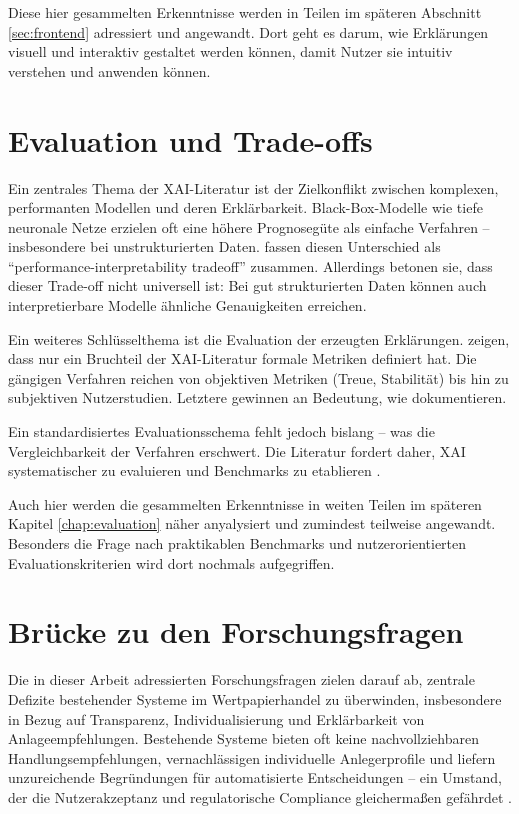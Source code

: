   Diese hier gesammelten Erkenntnisse werden in Teilen im späteren Abschnitt \ref{sec:frontend} adressiert und angewandt.
  Dort geht es darum, wie Erklärungen visuell und interaktiv gestaltet werden können, damit Nutzer sie intuitiv verstehen und anwenden können.

\section{Evaluation und Trade-offs}

  Ein zentrales Thema der \acs{XAI}-Literatur ist der Zielkonflikt zwischen komplexen, performanten Modellen und deren Erklärbarkeit.
  Black-Box-Modelle wie tiefe neuronale Netze erzielen oft eine höhere Prognosegüte als einfache Verfahren – insbesondere bei unstrukturierten Daten.
  \textcite[S. 3]{Liao2022} fassen diesen Unterschied als \enquote{performance-interpretability tradeoff} zusammen.
  Allerdings betonen sie, dass dieser Trade-off nicht universell ist:
  Bei gut strukturierten Daten können auch interpretierbare Modelle ähnliche Genauigkeiten erreichen.

  Ein weiteres Schlüsselthema ist die Evaluation der erzeugten Erklärungen.
  \textcite[S. 1]{Kadir2023} zeigen, dass nur ein Bruchteil der \acs{XAI}-Literatur formale Metriken definiert hat.
  Die gängigen Verfahren reichen von objektiven Metriken (Treue, Stabilität) bis hin zu subjektiven Nutzerstudien.
  Letztere gewinnen an Bedeutung, wie \textcite[S. 14]{Rong2022} dokumentieren.

  Ein standardisiertes Evaluationsschema fehlt jedoch bislang – was die Vergleichbarkeit der Verfahren erschwert.
  Die Literatur fordert daher, \acs{XAI} systematischer zu evaluieren und Benchmarks zu etablieren \autocite{Kadir2023, Rong2022}.

  Auch hier werden die gesammelten Erkenntnisse in weiten Teilen im späteren Kapitel \ref{chap:evaluation} näher anyalysiert und zumindest teilweise angewandt.
  Besonders die Frage nach praktikablen Benchmarks und nutzerorientierten Evaluationskriterien wird dort nochmals aufgegriffen.

\section{Brücke zu den Forschungsfragen}

    Die in dieser Arbeit adressierten Forschungsfragen zielen darauf ab, zentrale Defizite bestehender Systeme im Wertpapierhandel zu überwinden, insbesondere in Bezug auf Transparenz, Individualisierung und Erklärbarkeit von Anlageempfehlungen.
    Bestehende Systeme bieten oft keine nachvollziehbaren Handlungsempfehlungen, vernachlässigen individuelle Anlegerprofile und liefern unzureichende Begründungen für automatisierte Entscheidungen – ein Umstand, der die Nutzerakzeptanz und regulatorische Compliance gleichermaßen gefährdet \autocite{Weber2024, Liao2022}.


